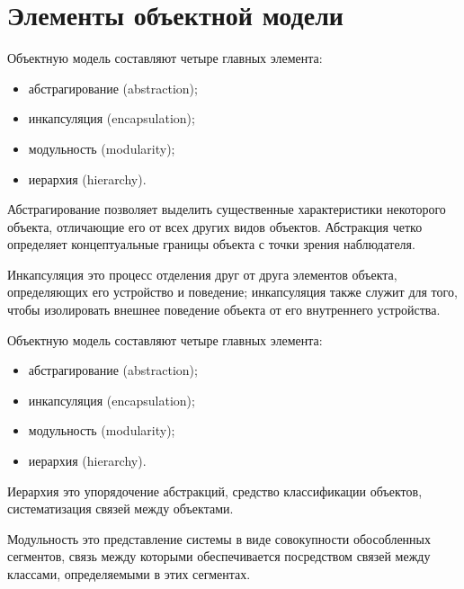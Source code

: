 \documentclass{beamer}
\begin{document}
\section{Элементы объектной модели}
\begin{frame}
Объектную модель составляют четыре главных элемента:
\begin{itemize}
\item абстрагирование (abstraction);
\item инкапсуляция (encapsulation);
\item модульность (modularity);
\item иерархия (hierarchy).
\end{itemize}
\begin{block}{Абстрагирование}
позволяет выделить существенные характеристики некоторого объекта, отличающие его от всех других видов объектов. Абстракция четко определяет концептуальные границы объекта с точки зрения наблюдателя.
\end{block}
\begin{block}{Инкапсуляция}
это процесс отделения друг от друга элементов объекта, определяющих его устройство и поведение; инкапсуляция также служит для того, чтобы изолировать внешнее поведение объекта от его внутреннего устройства.
\end{block}
\end{frame}

\begin{frame}
Объектную модель составляют четыре главных элемента:
\begin{itemize}
\item абстрагирование (abstraction);
\item инкапсуляция (encapsulation);
\item модульность (modularity);
\item иерархия (hierarchy).
\end{itemize}
\begin{block}{Иерархия}
это упорядочение абстракций, средство классификации объектов, систематизация связей между объектами.
\end{block}
\begin{block}{Модульность}
это представление системы в виде совокупности обособленных сегментов, связь между которыми обеспечивается посредством связей между классами, определяемыми в этих сегментах.
\end{block}
\end{frame}
\end{document}
